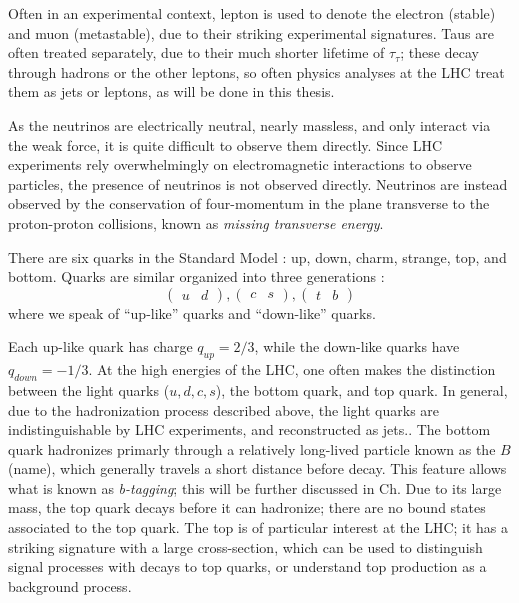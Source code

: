 Often in an experimental context, lepton is used to denote the electron (stable) and muon (metastable), due to their striking experimental signatures.
Taus are often treated separately, due to their much shorter lifetime of $\tau_{\tau}  $; these decay through hadrons or the other leptons, so often physics analyses at the LHC treat them as jets or leptons, as will be done in this thesis.

As the neutrinos are electrically neutral, nearly massless, and only interact via the weak force, it is quite difficult to observe them directly.
Since LHC experiments rely overwhelmingly on electromagnetic interactions to observe particles, the presence of neutrinos is not observed directly.
Neutrinos are instead observed by the conservation of four-momentum in the plane transverse to the proton-proton collisions, known as \textit{missing transverse energy}.

There are six quarks in the Standard Model : up, down, charm, strange, top, and bottom. Quarks are similar organized into three generations :
\begin{equation}
\begin{pmatrix} u & d \end{pmatrix} , \begin{pmatrix} c & s \end{pmatrix}, \begin{pmatrix} t & b \end{pmatrix}
\end{equation}
where we speak of ``up-like'' quarks and ``down-like'' quarks.

Each up-like quark has charge $q_{up} = 2/3$, while the down-like quarks have $q_{down} = -1/3$.
At the high energies of the LHC, one often makes the distinction between the light quarks ($u,d,c,s$), the bottom quark, and top quark.
In general, due to the hadronization process described above, the light quarks are indistinguishable by LHC experiments, and reconstructed as jets..
The bottom quark hadronizes primarly through a relatively long-lived particle known as the $ B$ (name), which generally travels a short distance before decay.
This feature allows what is known as \textit{b-tagging}; this will be further discussed in Ch.
Due to its large mass, the top quark decays before it can hadronize; there are no bound states associated to the top quark.
The top is of particular interest at the LHC; it has a striking signature with a large cross-section, which can be used to distinguish signal processes with decays to top quarks, or understand top production as a background process.

